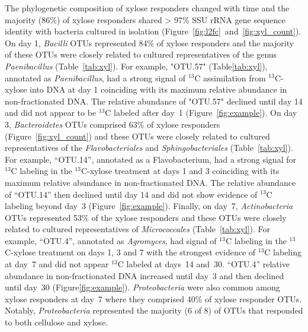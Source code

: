 The phylogenetic composition of xylose responders changed with time and the
majority (86\%) of xylose responders shared > 97\% SSU rRNA gene sequence
identity with bacteria cultured in isolation
(Figure~\ref{fig:l2fc}~and~\ref{fig:xyl_count}). On day 1, \textit{Bacilli}
OTUs represented 84\% of xylose responders and the majority of these OTUs were
closely related to cultured representatives of the genus \textit{Paenibacillus}
(Table~\ref{tab:xyl}). For example, "OTU.57" (Table\ref{tab:xyl}),
annotated as \textit{Paenibacillus}, had a strong signal of $^{13}$C
assimilation from $^{13}$C-xylose into DNA at day 1 coinciding with its maximum
relative abundance in non-fractionated DNA. The relative abundance of "OTU.57"
declined until day 14 and did not appear to be $^{13}$C labeled after day~1
(Figure~\ref{fig:example}). On day 3, \textit{Bacteroidetes} OTUs comprised
63\% of xylose responders (Figure~\ref{fig:xyl_count}) and these OTUs were
closely related to cultured representatives of the \textit{Flavobacteriales}
and \textit{Sphingobacteriales} (Table~\ref{tab:xyl}). For example, ``OTU.14'',
annotated as a Flavobacterium, had a strong signal for $^{13}$C labeling in the
$^{13}$C-xylose treatment at days 1 and 3 coinciding with its maximum relative
abundance in non-fractionated DNA. The relative abundance of ``OTU.14'' then
declined until day 14 and did not show evidence of $^{13}$C labeling beyond
day~3 (Figure~\ref{fig:example}). Finally, on day~7, \textit{Actinobacteria}
OTUs represented 53\% of the xylose responders and these OTUs were closely
related to cultured representatives of \textit{Micrococcales}
(Table~\ref{tab:xyl}). For example, ``OTU.4'', annotated as \textit{Agromyces},
had signal of $^{13}$C labeling in the $^{13}$C-xylose treatment on days 1,
3 and 7 with the strongest evidence of $^{13}$C labeling at day~7 and did not
appear $^{13}$C labeled at days~14 and~30. ``OTU.4'' relative abundance in
non-fractionated DNA increased until day~3 and then declined until
day~30 (Figure\ref{fig:example}). \textit{Proteobacteria} were also common
among xylose responders at day~7 where they comprised 40\% of xylose responder
OTUs. Notably, \textit{Proteobacteria} represented the majority (6 of 8) of
OTUs that responded to both cellulose and xylose. 

